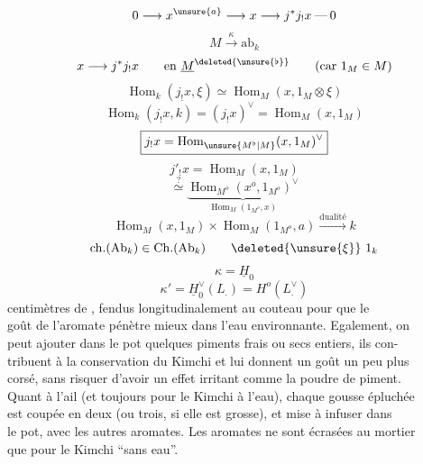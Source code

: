 \[
0\longrightarrow x^{\unsure{a}}\longrightarrow x\longrightarrow j^*j_!x\mathbin{\text{---}}0
\]
\[
M\xrightarrow{\kappa}\mathrm{ab}_k
\]
\[
x\longrightarrow j^*j_!x\qquad\text{en }\underline M^{\deleted{\unsure{\flat}}}
\qquad(\text{car }1_M\in M)
\]
\[
\operatorname{Hom}_k(j_!x,\xi)\simeq\operatorname{Hom}_M(x,1_M\otimes\xi)
\]
\[
\operatorname{Hom}_k(j_!x,k)=(j_!x)^\vee=\operatorname{Hom}_M(x,1_M)
\]
\[
\boxed{j_!x=\operatorname{Hom}_{\unsure{M^\flat|M}}(x,1_M)^\vee}
\]
\[
j'_!x=\operatorname{Hom}_M(x,1_M)
\]
\[
\overset{?}{\simeq}
\underbrace{\operatorname{Hom}_{M^o}(x^o,1_{M^o})^\vee}_{\operatorname{Hom}_M(1_{M^o},x)}
\]
\[
\operatorname{Hom}_M(x,1_M)\times\operatorname{Hom}_M(1_{M^o},a)
\xrightarrow{\text{dualité}}k
\]
\[
\mathrm{ch}.(\mathrm{Ab}_k)\in\mathrm{Ch}.(\mathrm{Ab}_k)
\qquad\deleted{\unsure{\xi}}\ 1_k
\]
\[
\kappa=\underline H_0
\]
\[
\kappa'=\underline H_0^\vee(L_.)=H^o(L_.^\vee)
\]
centimètres de , fendus longitudinalement au couteau pour que le\\
goût de l'aromate pénètre mieux dans l'eau environnante. Egalement, on\\
peut ajouter dans le pot quelques piments frais ou secs entiers, ils con-\\
tribuent à la conservation du Kimchi et lui donnent un goût un peu plus\\
corsé, sans risquer d'avoir un effet irritant comme la poudre de piment.\\
Quant à l'ail (et toujours pour le Kimchi à l'eau), chaque gousse épluchée\\
est coupée en deux (ou trois, si elle est grosse), et mise à infuser dans\\
le pot, avec les autres aromates. Les aromates ne sont écrasées au mortier\\
que pour le Kimchi ``sans eau''.

